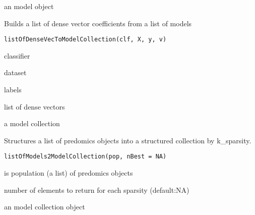 \documentclass[a4paper]{book}
\begin{document}
%
\begin{Value}
an model object
\end{Value}
%
\begin{Description}
Builds a list of dense vector coefficients from a list of models
\end{Description}
%
\begin{Usage}
\begin{verbatim}
listOfDenseVecToModelCollection(clf, X, y, v)
\end{verbatim}
\end{Usage}
%
\begin{Arguments}
\begin{ldescription}
\item[\code{clf:}] classifier

\item[\code{X:}] dataset

\item[\code{y:}] labels

\item[\code{v:}] list of dense vectors
\end{ldescription}
\end{Arguments}
%
\begin{Value}
a model collection
\end{Value}
%
\begin{Description}
Structures a list of predomics objects into a structured collection by k\_sparsity.
\end{Description}
%
\begin{Usage}
\begin{verbatim}
listOfModels2ModelCollection(pop, nBest = NA)
\end{verbatim}
\end{Usage}
%
\begin{Arguments}
\begin{ldescription}
\item[\code{pop:}] is population (a list) of predomics objects

\item[\code{nBest:}] number of elements to return for each sparsity (default:NA)
\end{ldescription}
\end{Arguments}
%
\begin{Value}
an model collection object
\end{Value}
\end{document}
